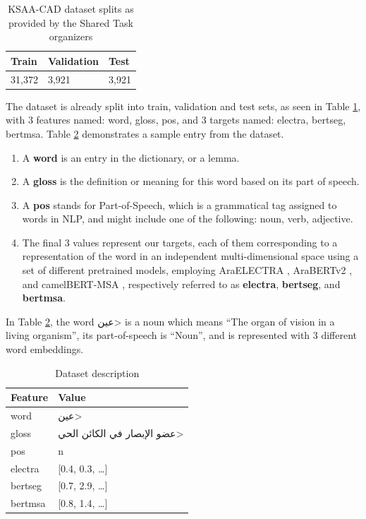 \documentclass[12pt]{article}
\begin{document}
\begin{table}[H]
    \centering
    \caption{KSAA-CAD dataset splits as provided by the Shared Task organizers}
    \label{table:dataset-splits}
    \renewcommand{\arraystretch}{1.5}%
    \begin{tabularx}{\textwidth}{|X|X|X|}
        \hline
        \textbf{Train} & \textbf{Validation} & \textbf{Test} \\
        \hline
        31,372 & 3,921 & 3,921 \\
        \hline
    \end{tabularx}
\end{table}

The dataset is already split into train, validation and test sets, as seen in Table \ref{table:dataset-splits}, with 3 features named: word, gloss, pos, and 3 targets named: electra, bertseg, bertmsa. Table \ref{table:dataset-desc} demonstrates a sample entry from the dataset.

\begin{enumerate}
    \item A \textbf{word} is an entry in the dictionary, or a lemma.
    \item A \textbf{gloss} is the definition or meaning for this word based on its part of speech.
    \item A \textbf{pos} stands for Part-of-Speech, which is a grammatical tag assigned to words in NLP, and might include one of the following: noun, verb, adjective.
    \item The final 3 values represent our targets, each of them corresponding to a representation of the word in an independent multi-dimensional space using a set of different pretrained models, employing AraELECTRA \cite{Antoun2020-araELECTRA}, AraBERTv2 \cite{Antoun2020-araBERT}, and camelBERT-MSA \cite{inoue2021}, respectively referred to as \textbf{electra}, \textbf{bertseg}, and \textbf{bertmsa}.
\end{enumerate}

In Table \ref{table:dataset-desc}, the word \<عين> is a noun which means “The organ of vision in a living organism”, its part-of-speech is “Noun”, and is represented with 3 different word embeddings.

\begin{table}
    \centering
    \caption{Dataset description}
    \label{table:dataset-desc}
    \renewcommand{\arraystretch}{1.5}%
    \begin{tabularx}{\textwidth}{|l|X|}
        \hline
        \textbf{Feature} & \textbf{Value} \\
        \hline
        word & \<عين> \\
        \hline
        gloss & \<عضو الإبصار في الكائن الحي> \\
        \hline
        pos & n \\
        \hline
        electra & [0.4, 0.3, …] \\
        \hline
        bertseg & [0.7, 2.9, …] \\
        \hline
        bertmsa & [0.8, 1.4, …] \\
        \hline
    \end{tabularx}
\end{table}
\end{document}
